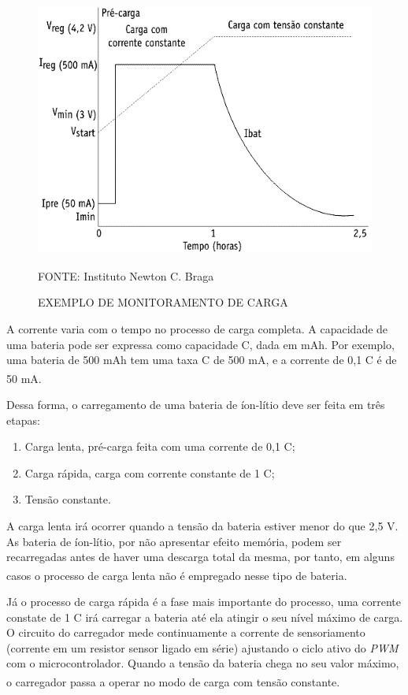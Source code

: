 \documentclass[
	12pt,				%
	openright,			%
	oneside,			%
	a4paper,			%
	english,			%
	french,				%
	spanish,			%
	brazil,				%
	oldfontcommands
	]{abntex2}
\begin{document}
	\begin{figure}[th]
		\caption{EXEMPLO DE MONITORAMENTO DE CARGA}
		\label{Fig_Bat_Monit}
		\centering
		\includegraphics[width=0.67\linewidth]{./figs/bat_monit}
			
		\begin{small}
			FONTE: Instituto Newton C. Braga\textsuperscript{\cite{carregador}}
		\end{small}	
	\end{figure}

	A corrente varia com o tempo no processo de carga completa. A capacidade de uma bateria pode ser expressa como capacidade C, dada em mAh. Por exemplo, uma bateria de 500 mAh tem uma taxa C de 500 mA, e a corrente de 0,1 C é de 50 mA.\textsuperscript{\cite{carregador}}
	
	Dessa forma, o carregamento de uma bateria de íon-lítio deve ser feita em três etapas:
	
	\begin{enumerate}
		\item Carga lenta, pré-carga feita com uma corrente de 0,1 C;
		\item Carga rápida, carga com corrente constante de 1 C;
		\item Tensão constante.
	\end{enumerate}
	
	A carga lenta irá ocorrer quando a tensão da bateria estiver menor do que 2,5 V. As bateria de íon-lítio, por não apresentar efeito memória, podem ser recarregadas antes de haver uma descarga total da mesma, por tanto, em alguns casos o processo de carga lenta não é empregado nesse tipo de bateria.\textsuperscript{\cite{carregador}}
	
	Já o processo de carga rápida é a fase mais importante do processo, uma corrente constate de 1 C irá carregar a bateria até ela atingir o seu nível máximo de carga. O circuito do carregador mede continuamente a corrente de sensoriamento (corrente em um resistor sensor ligado em série) ajustando o ciclo ativo do \textit{PWM} com o microcontrolador. Quando a tensão da bateria chega no seu valor máximo, o carregador passa a operar no modo de carga com tensão constante.\textsuperscript{\cite{carregador}}
	
\end{document}
